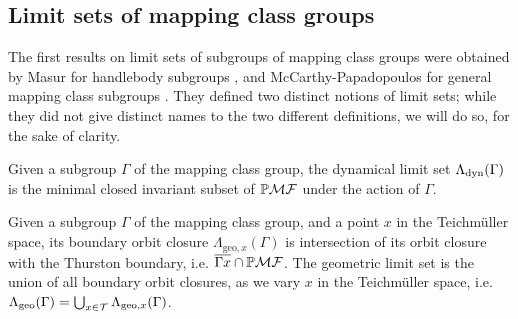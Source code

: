 \documentclass[12pt, reqno]{amsart}
\begin{document}


\subsection{Limit sets of mapping class groups}
\label{sec:backgr-limit-sets}

The first results on limit sets of subgroups of mapping class groups were obtained by Masur for handlebody subgroups \cite{masur_1986}, and McCarthy-Papadopoulos for general mapping class subgroups \cite{McCarthy1989}.
They defined two distinct notions of limit sets; while they did not give distinct names to the two different definitions, we will do so, for the sake of clarity.
\begin{definition}
  Given a subgroup $\Gamma$ of the mapping class group, the dynamical limit set $\Lambda_{\mathrm{dyn}}(\Gamma)$ is the minimal closed invariant subset of $\mathbb{P}\mathcal{MF}$ under the action of $\Gamma$.
\end{definition}
\begin{definition}
  Given a subgroup $\Gamma$ of the mapping class group, and a point $x$ in the Teichmüller space, its boundary orbit closure $\Lambda_{\mathrm{geo}, x}(\Gamma)$ is intersection of its orbit closure with the Thurston boundary, i.e. $\overline{\Gamma x} \cap \mathbb{P}\mathcal{MF}$.
  The geometric limit set is the union of all boundary orbit closures, as we vary $x$ in the Teichmüller space, i.e. $\Lambda_{\mathrm{geo}}(\Gamma) = \bigcup_{x \in \mathcal{T}} \Lambda_{\mathrm{geo}, x}(\Gamma)$.
\end{definition}
\end{document}

